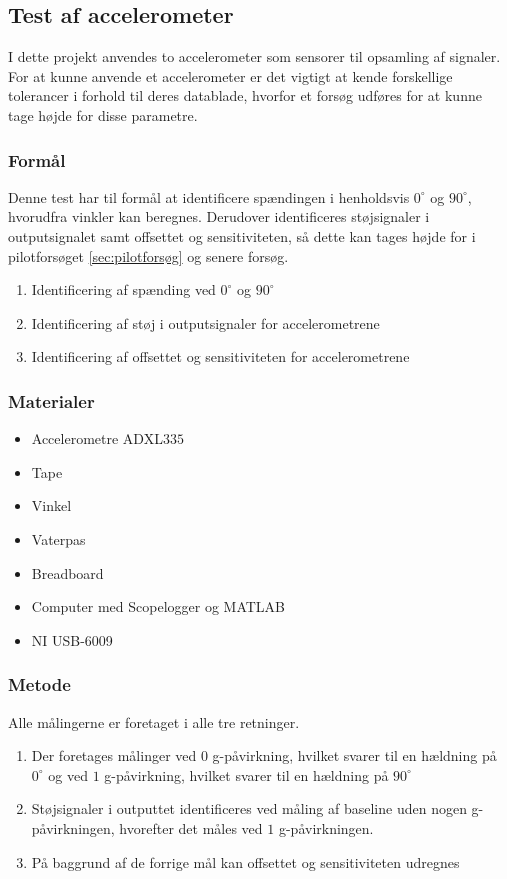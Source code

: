 \subsection{Test af accelerometer} \label{sec:test_acc}
I dette projekt anvendes to accelerometer som sensorer til opsamling af signaler. For at kunne anvende et accelerometer er det vigtigt at kende forskellige tolerancer i forhold til deres datablade, hvorfor et forsøg udføres for at kunne tage højde for disse parametre.

\subsubsection{Formål}
Denne test har til formål at identificere spændingen i henholdsvis $0^{\circ}$ og $90^{\circ}$, hvorudfra vinkler kan beregnes. Derudover identificeres støjsignaler i outputsignalet samt offsettet og sensitiviteten, så dette kan tages højde for i pilotforsøget \autoref{sec:pilotforsøg} og senere forsøg. 

\begin{enumerate}
\item Identificering af spænding ved $0^{\circ}$ og $90^{\circ}$
\item Identificering af støj i outputsignaler for accelerometrene
\item Identificering af offsettet og sensitiviteten for accelerometrene
\end{enumerate}

\subsubsection{Materialer}
\begin{itemize}
\item Accelerometre ADXL$335$
\item Tape
\item Vinkel
\item Vaterpas
\item Breadboard
\item Computer med Scopelogger og MATLAB
\item NI USB-6009
\end{itemize}

\subsubsection{Metode}
Alle målingerne er foretaget i alle tre retninger. 
\begin{enumerate}
\item Der foretages målinger ved $0$ g-påvirkning, hvilket svarer til en hældning på $0^{\circ}$ og ved $1$ g-påvirkning, hvilket svarer til en hældning på $90^{\circ}$
\item Støjsignaler i outputtet identificeres ved måling af baseline uden nogen g-påvirkningen, hvorefter det måles ved $1$ g-påvirkningen. 
\item På baggrund af de forrige mål kan offsettet og sensitiviteten udregnes
\end{enumerate}

